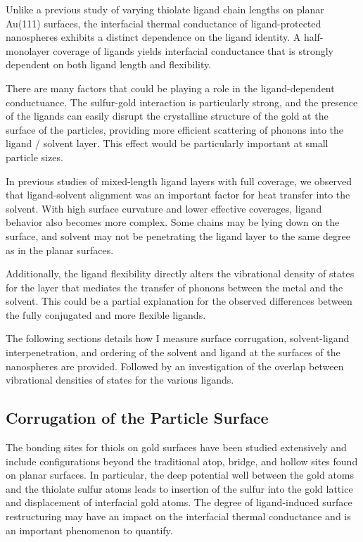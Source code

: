 Unlike a previous study of varying thiolate ligand chain lengths on
planar Au(111) surfaces, the interfacial thermal conductance of
ligand-protected nanospheres exhibits a distinct dependence on the
ligand identity.\cite{Stocker:2013cl} A half-monolayer coverage of ligands yields
interfacial conductance that is strongly dependent on both ligand
length and flexibility.

There are many factors that could be playing a role in the
ligand-dependent conductuance.  The sulfur-gold interaction is
particularly strong, and the presence of the ligands can easily
disrupt the crystalline structure of the gold at the surface of the
particles, providing more efficient scattering of phonons into the
ligand / solvent layer. This effect would be particularly important at
small particle sizes.

In previous studies of mixed-length ligand layers with full coverage,
we observed that ligand-solvent alignment was an important factor for
heat transfer into the solvent.  With high surface curvature and lower
effective coverages, ligand behavior also becomes more complex. Some
chains may be lying down on the surface, and solvent may not be
penetrating the ligand layer to the same degree as in the planar
surfaces.  

Additionally, the ligand flexibility directly alters the vibrational
density of states for the layer that mediates the transfer of phonons
between the metal and the solvent. This could be a partial explanation
for the observed differences between the fully conjugated and more
flexible ligands.

The following sections details how I
measure surface corrugation, solvent-ligand interpenetration, and
ordering of the solvent and ligand at the surfaces of the
nanospheres are provided. Followed by an investigation of 
the overlap between vibrational densities of states for the various ligands.

\subsection{Corrugation of the Particle Surface}

The bonding sites for thiols on gold surfaces have been studied
extensively and include configurations beyond the traditional atop,
bridge, and hollow sites found on planar surfaces. In particular, the
deep potential well between the gold atoms and the thiolate sulfur
atoms leads to insertion of the sulfur into the gold lattice and
displacement of interfacial gold atoms. The degree of ligand-induced
surface restructuring may have an impact on the interfacial thermal
conductance and is an important phenomenon to quantify.

